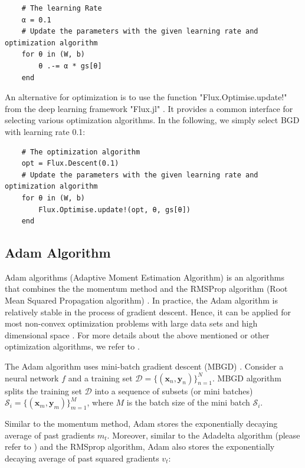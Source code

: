 \documentclass[
	parskip, 			   %
	twoside, 			   %
	DIV=14, 			   %
	BCOR=15.0mm, 		   %
	headsepline, 		   %
	open=right, 		   %
	captions=tableheading, %
	bibliography=totoc,    %
	numbers=noenddot       %
]{scrreprt}
\begin{document}
\begin{verbatim}
    # The learning Rate
    α = 0.1
    # Update the parameters with the given learning rate and optimization algorithm
    for θ in (W, b)
        θ .-= α * gs[θ]
    end
\end{verbatim}

An alternative for optimization is to use the function "Flux.Optimise.update!" from the deep learning framework "Flux.jl" \cite{Flux.jl-2018} \cite{innes:2018}. It provides a common interface for selecting various optimization algorithms. In the following, we simply select BGD with learning rate 0.1:

\begin{verbatim}
    # The optimization algorithm
    opt = Flux.Descent(0.1)
    # Update the parameters with the given learning rate and optimization algorithm
    for θ in (W, b)
        Flux.Optimise.update!(opt, θ, gs[θ])
    end
\end{verbatim}

\subsection{Adam Algorithm}
Adam algorithms (Adaptive Moment Estimation Algorithm) \cite{kingma2014adam} is an algorithms that combines the the momentum method \cite{qian1999momentum} and the RMSProp algorithm (Root Mean Squared Propagation algorithm) \cite{tieleman2012divide}. In practice, the Adam algorithm is relatively stable in the process of gradient descent. Hence, it can be applied for most non-convex optimization problems with large data sets and high dimensional space \cite{sun2019survey}. For more details about the above mentioned or other optimization algorithms, we refer to \cite{ruder2016overview}.

The Adam algorithm uses mini-batch gradient descent (MBGD) \cite{bottou2010large}. Consider a neural network $f$ and a training set $\mathcal{D}=\{ (\mathbf{x}_{n}, \mathbf{y}_{n}) \}_{n=1}^{N}$. MBGD algorithm splits the training set $\mathcal{D}$ into a sequence of subsets (or mini batches) $\mathcal{S}_i=\{(\mathbf{x}_{m}, \mathbf{y}_{m}) \}_{m=1}^{M}$, where $M$ is the batch size of the mini batch $\mathcal{S}_i$.

Similar to the momentum method, Adam stores the exponentially decaying average of past gradients $m_t$. Moreover, similar to the Adadelta algorithm (please refer to \cite{zeiler2012adadelta}) and the RMSprop algorithm, Adam also stores the exponentially decaying average of past squared gradients $v_t$:
\end{document}
